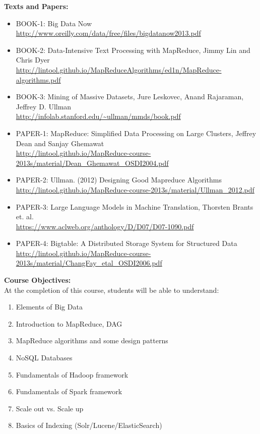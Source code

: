 \documentclass[11pt]{article}
\begin{document}
\textbf {\large Texts and Papers:} 
\begin{itemize}
\item  \label{BOOK-1} BOOK-1: Big Data Now \\
        \url{http://www.oreilly.com/data/free/files/bigdatanow2013.pdf}

\item \label{BOOK-2} BOOK-2: Data-Intensive Text Processing with MapReduce, Jimmy Lin and Chris Dyer \\
        \url{http://lintool.github.io/MapReduceAlgorithms/ed1n/MapReduce-algorithms.pdf}

\item \label{BOOK-3} BOOK-3: Mining of Massive Datasets, Jure Leskovec, Anand Rajaraman, Jeffrey D. Ullman \\
        \url{http://infolab.stanford.edu/~ullman/mmds/book.pdf}

\item \label{PAPER-1} PAPER-1: MapReduce: Simplified Data Processing on Large Clusters, Jeffrey Dean and Sanjay Ghemawat \\
          \url{http://lintool.github.io/MapReduce-course-2013s/material/Dean_Ghemawat_OSDI2004.pdf}

\item \label{PAPER-2} PAPER-2: Ullman. (2012) Designing Good Mapreduce Algorithms \\
         \url{http://lintool.github.io/MapReduce-course-2013s/material/Ullman_2012.pdf}
         
\item \label{PAPER-3} PAPER-3: Large Language Models in Machine Translation, Thorsten Brants et. al. \\
         \url{https://www.aclweb.org/anthology/D/D07/D07-1090.pdf}
         
\item \label{PAPER-4} PAPER-4: Bigtable: A Distributed Storage System for Structured Data \\
         \url{http://lintool.github.io/MapReduce-course-2013s/material/ChangFay_etal_OSDI2006.pdf}
\end{itemize}         


\textbf {\large Course Objectives:} \\
At the completion of this course, students will be able to understand:
\begin{enumerate} \itemsep-0.4em
  \item Elements of Big Data
  \item Introduction to MapReduce, DAG
  \item MapReduce algorithms and some design patterns
  \item NoSQL Databases
  \item Fundamentals of Hadoop framework
  \item Fundamentals of Spark framework
  \item Scale out vs. Scale up
  \item Basics of Indexing (Solr/Lucene/ElasticSearch)
\end{enumerate}
\end{document}
